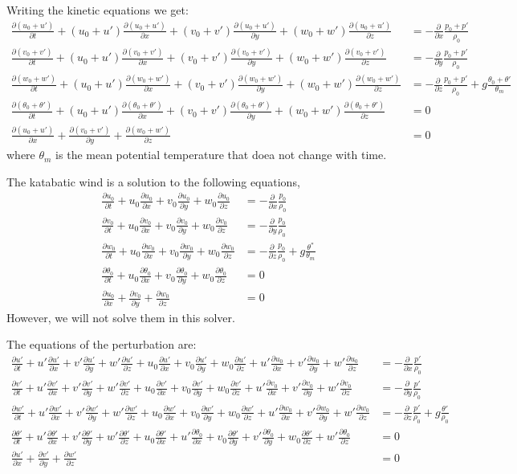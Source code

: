 \documentclass[a4paper,10pt]{article}
\newcommand{\pd}[2]{\frac{\partial #1}{\partial #2}}
\newcommand{\Ddtf}[4]{\pd{#1}{t} + #2\pd{#1}{x} + #3\pd{#1}{y} + #4\pd{#1}{z}}
\newcommand{\fvar}[1]{#1_0+#1'}
\begin{document}
Writing the kinetic equations we get: 
\begin{equation}
  \begin{align}
    \Ddtf{(\fvar{u})}{(\fvar{u})}{(\fvar{v})}{(\fvar{w})} &= -\pd{\,}{x}\frac{\fvar{p}}{\rho_0} \\
    \Ddtf{(\fvar{v})}{(\fvar{u})}{(\fvar{v})}{(\fvar{w})} &= -\pd{\,}{y}\frac{\fvar{p}}{\rho_0} \\
    \Ddtf{(\fvar{w})}{(\fvar{u})}{(\fvar{v})}{(\fvar{w})} &= -\pd{\,}{z}\frac{\fvar{p}}{\rho_0} + g\frac{\theta_0+\theta'}{\theta_m}\\
    \Ddtf{(\fvar{\theta})}{(\fvar{u})}{(\fvar{v})}{(\fvar{w})} &= 0\\
    \pd{(\fvar{u})}{x}  + \pd{(\fvar{v})}{y} + \pd{(\fvar{w})}{z} &= 0    
  \end{align}
\end{equation}
where $\theta_m$ is the mean potential temperature that doea not change with time. 

The katabatic wind is a solution to the following equations, 
\begin{equation}
 \begin{align}
    \Ddtf{u_0}{u_0}{v_0}{w_0} &= -\pd{\,}{x}\frac{p_0}{\rho_0} \\
    \Ddtf{v_0}{u_0}{v_0}{w_0} &= -\pd{\,}{y}\frac{p_0}{\rho_0} \\
    \Ddtf{w_0}{u_0}{v_0}{w_0} &= -\pd{\,}{z}\frac{p_0}{\rho_0} + g\frac{\theta^*}{\theta_m}\\ 
    \Ddtf{\theta_0}{u_0}{v_0}{w_0} &= 0\\
    \pd{u_0}{x}  + \pd{v_0}{y} + \pd{w_0}{z} &= 0    
  \end{align}
\end{equation}
However, we will not solve them in this solver. 

The equations of the perturbation are: 
\begin{equation}
  \begin{align}
    \Ddtf{u'}{u'}{v'}{w'} + u_0\pd{u'}{x} + v_0\pd{u'}{y} + w_0\pd{u'}{z} + u'\pd{u_0}{x}  + v'\pd{u_0}{y}  + w'\pd{u_0}{z} &= -\pd{\,}{x}\frac{p'}{\rho_0} \\
    \Ddtf{v'}{u'}{v'}{w'} + u_0\pd{v'}{x} + v_0\pd{v'}{y} + w_0\pd{v'}{z} + u'\pd{v_0}{x}  + v'\pd{v_0}{y}  + w'\pd{v_0}{z} &= -\pd{\,}{y}\frac{p'}{\rho_0} \\
    \Ddtf{w'}{u'}{v'}{w'} + u_0\pd{w'}{x} + v_0\pd{w'}{y} + w_0\pd{w'}{z} + u'\pd{w_0}{x}  + v'\pd{w_0}{y}  + w'\pd{w_0}{z} &= -\pd{\,}{z}\frac{p'}{\rho_0} + g\frac{\theta'}{\rho_0}\\
    \Ddtf{\theta'}{u'}{v'}{w'} + u_0\pd{\theta'}{x} + u'\pd{\theta_0}{x} + v_0\pd{\theta'}{y} + v'\pd{\theta_0}{y} + w_0\pd{\theta'}{z} + w'\pd{\theta_0}{z} &= 0\\
    \pd{u'}{x}  + \pd{v'}{y} + \pd{w'}{z} &= 0    
  \end{align}
  \label{eqn:openforms}
\end{equation}
\end{document}
